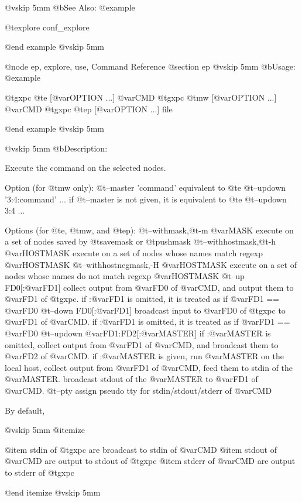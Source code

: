 @vskip 5mm
@b{See Also:}
@example

  @t{explore} conf_explore

@end example
@vskip 5mm

@node ep, explore, use, Command Reference
@section ep
@vskip 5mm
@b{Usage:}
@example

  @t{gxpc} @t{e}  [@var{OPTION} ...] @var{CMD}
  @t{gxpc} @t{mw} [@var{OPTION} ...] @var{CMD}
  @t{gxpc} @t{ep} [@var{OPTION} ...] file

@end example
@vskip 5mm

@vskip 5mm
@b{Description:}


  Execute the command on the selected nodes.

Option (for @t{mw} only):
  @t{--master} 'command'
    equivalent to @t{e} @t{--updown} '3:4:command' ...
  if @t{--master} is not given, it is equivalent to @t{e} @t{--updown} 3:4 ...

Options (for @t{e}, @t{mw}, and @t{ep}):
  @t{--withmask},@t{-m} @var{MASK}
    execute on a set of nodes saved by @t{savemask} or @t{pushmask}
  @t{--withhostmask},@t{-h} @var{HOSTMASK}
    execute on a set of nodes whose names match regexp @var{HOSTMASK}
  @t{--withhostnegmask},-H @var{HOSTMASK}
    execute on a set of nodes whose names do not match regexp @var{HOSTMASK}
  @t{--up} FD0[:@var{FD1}]
    collect output from @var{FD0} of @var{CMD}, and output them to @var{FD1} of @t{gxpc}.
    if :@var{FD1} is omitted, it is treated as if @var{FD1} == @var{FD0}
  @t{--down} FD0[:@var{FD1}]
    broadcast input to @var{FD0} of @t{gxpc} to @var{FD1} of @var{CMD}.
    if :@var{FD1} is omitted, it is treated as if @var{FD1} == @var{FD0}
  @t{--updown} @var{FD1}:FD2[:@var{MASTER}]
    if :@var{MASTER} is omitted, collect output from @var{FD1} of @var{CMD},
    and broadcast them to @var{FD2} of @var{CMD}.
    if :@var{MASTER} is given, run @var{MASTER} on the local host, collect
    output from @var{FD1} of @var{CMD}, feed them to stdin of the @var{MASTER}.
    broadcast stdout of the @var{MASTER} to @var{FD1} of @var{CMD}.
  @t{--pty}
    assign pseudo tty for stdin/stdout/stderr of @var{CMD}

By default,

@vskip 5mm
@itemize

@item  stdin of @t{gxpc} are broadcast to stdin of @var{CMD}
@item  stdout of @var{CMD} are output to stdout of @t{gxpc}
@item  stderr of @var{CMD} are output to stderr of @t{gxpc}

@end itemize
@vskip 5mm

